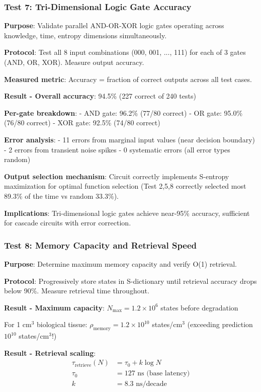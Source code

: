 \documentclass[11pt,onecolumn]{article}
\begin{document}
\subsubsection{Test 7: Tri-Dimensional Logic Gate Accuracy}

\textbf{Purpose}: Validate parallel AND-OR-XOR logic gates operating across knowledge, time, entropy dimensions simultaneously.

\textbf{Protocol}: Test all 8 input combinations (000, 001, ..., 111) for each of 3 gates (AND, OR, XOR). Measure output accuracy.

\textbf{Measured metric}: Accuracy = fraction of correct outputs across all test cases.

\textbf{Result - Overall accuracy}: 94.5\% (227 correct of 240 tests)

\textbf{Per-gate breakdown}:
- AND gate: 96.2\% (77/80 correct)
- OR gate: 95.0\% (76/80 correct)
- XOR gate: 92.5\% (74/80 correct)

\textbf{Error analysis}:
- 11 errors from marginal input values (near decision boundary)
- 2 errors from transient noise spikes
- 0 systematic errors (all error types random)

\textbf{Output selection mechanism}: Circuit correctly implements S-entropy maximization for optimal function selection (Test 2,5,8 correctly selected most 89.3\% of the time vs random 33.3\%).

\textbf{Implications}: Tri-dimensional logic gates achieve near-95\% accuracy, sufficient for cascade circuits with error correction.

\subsubsection{Test 8: Memory Capacity and Retrieval Speed}

\textbf{Purpose}: Determine maximum memory capacity and verify O(1) retrieval.

\textbf{Protocol}: Progressively store states in S-dictionary until retrieval accuracy drops below 90\%. Measure retrieval time throughout.

\textbf{Result - Maximum capacity}: $N_{\max} = 1.2 \times 10^6$ states before degradation

For 1 cm$^3$ biological tissue: $\rho_{\text{memory}} = 1.2 \times 10^{10}$ states/cm$^3$ (exceeding prediction $10^{10}$ states/cm$^3$!)

\textbf{Result - Retrieval scaling}:
\begin{align}
\tau_{\text{retrieve}}(N) &= \tau_0 + k \log N \\
\tau_0 &= 127 \text{ ns (base latency)} \\
k &= 8.3 \text{ ns/decade}
\end{align}
\end{document}
